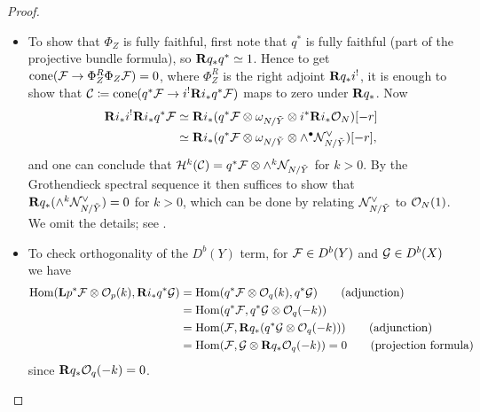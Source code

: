 \begin{proof}
\begin{itemize}
        \item To show that $\Phi_Z$ is fully faithful, first note that $q^*$ is
            fully faithful (part of the projective bundle formula), so
            $\mathbf{R} q_*q^*\simeq1$. Hence to get
            $\operatorname{cone}(\mathcal{F}\to\Phi_Z^R\Phi_Z\mathcal{F})=0$, where $\Phi_Z^R$ is the
            right adjoint $\mathbf{R} q_*i^!$, it is enough to show that
            $\mathcal{C}\coloneqq\operatorname{cone}(q^*\mathcal{F}\to i^!\mathbf{R} i_*q^*\mathcal{F})$ maps to zero
            under $\mathbf{R} q_*$. Now
            \begin{align*}
                \mathbf{R} i_*i^!\mathbf{R} i_*q^*\mathcal{F}
                    &\simeq \mathbf{R} i_*(q^*\mathcal{F}
                        \otimes\omega_{N/\tilde Y}
                        \otimes i^*\mathbf{R} i_*\mathcal{O}_N)[-r] \\
                    &\simeq \mathbf{R} i_*(q^*\mathcal{F}
                        \otimes\omega_{N/\tilde Y}
                        \otimes\wedge^\bullet\mathcal{N}_{N/\tilde Y}^\vee)[-r],
            \end{align*}
            and one can conclude that
            $\mathcal{H}^k(\mathcal{C})=q^*\mathcal{F}\otimes\wedge^k\mathcal{N}_{N/\tilde Y}$ for
            $k>0$. By the Grothendieck spectral sequence it then suffices to
            show that $\mathbf{R} q_*(\wedge^k\mathcal{N}^\vee_{N/\tilde Y})=0$ for $k>0$,
            which can be done by relating $\mathcal{N}^\vee_{N/\tilde Y}$ to
            $\mathcal{O}_N(1)$. We omit the details; see \cite[Prop 1.17]{OrlovKnorrer}.

        \item To check orthogonality of the $D^b(Y)$ term, for $\mathcal{F}\in D^b(Y)$
            and $\mathcal{G}\in D^b(X)$ we have
            \begin{align*}
                \operatorname{Hom}(\mathbf{L} p^*\mathcal{F}\otimes\mathcal{O}_p(k),\mathbf{R} i_*q^*\mathcal{G})
                    &= \operatorname{Hom}(q^*\mathcal{F}\otimes\mathcal{O}_q(k),q^*\mathcal{G})
                    \qquad \text{(adjunction)} \\
                    &= \operatorname{Hom}(q^*\mathcal{F},q^*\mathcal{G}\otimes\mathcal{O}_q(-k)) \\
                    &= \operatorname{Hom}(\mathcal{F},\mathbf{R} q_*(q^*\mathcal{G}\otimes\mathcal{O}_q(-k)))
                    \qquad \text{(adjunction)} \\
                    &= \operatorname{Hom}(\mathcal{F},\mathcal{G}\otimes\mathbf{R} q_*\mathcal{O}_q(-k))
                    = 0 \qquad \text{(projection formula)}
            \end{align*}
            since $\mathbf{R} q_*\mathcal{O}_q(-k)=0$.


\end{itemize}
\end{proof}
